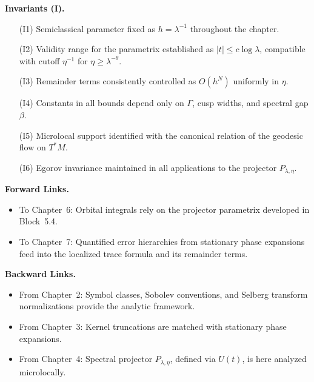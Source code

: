 \medskip

\noindent\textbf{Invariants (I).}
\begin{itemize}
   \item[(I1)] Semiclassical parameter fixed as $h=\lambda^{-1}$ throughout the chapter.
   \item[(I2)] Validity range for the parametrix established as $|t|\le c\log \lambda$, compatible with cutoff $\eta^{-1}$ for $\eta \ge \lambda^{-\theta}$.
   \item[(I3)] Remainder terms consistently controlled as $O(h^N)$ uniformly in $\eta$.
   \item[(I4)] Constants in all bounds depend only on $\Gamma$, cusp widths, and spectral gap $\beta$.
   \item[(I5)] Microlocal support identified with the canonical relation of the geodesic flow on $T^*M$.
   \item[(I6)] Egorov invariance maintained in all applications to the projector $P_{\lambda,\eta}$.
\end{itemize}

\medskip

\noindent\textbf{Forward Links.}
\begin{itemize}
   \item To Chapter~6: Orbital integrals rely on the projector parametrix developed in Block~5.4.
   \item To Chapter~7: Quantified error hierarchies from stationary phase expansions feed into the localized trace formula and its remainder terms.
\end{itemize}

\medskip

\noindent\textbf{Backward Links.}
\begin{itemize}
   \item From Chapter~2: Symbol classes, Sobolev conventions, and Selberg transform normalizations provide the analytic framework.
   \item From Chapter~3: Kernel truncations are matched with stationary phase expansions.
   \item From Chapter~4: Spectral projector $P_{\lambda,\eta}$, defined via $U(t)$, is here analyzed microlocally.
\end{itemize}

\medskip

